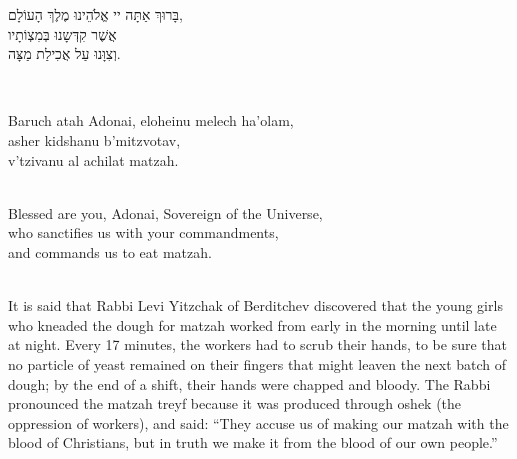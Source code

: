 \documentclass[extrafontsizes,twoside,17pt,a4paper,openany]{memoir}
\newcommand{\ch}{ch}
\newenvironment{HgHebrew}{\begin{hebrew}\noindent\large}{\end{hebrew}}
\newenvironment{HgEnglish}{\strut\\\noindent}{\vspace{1em}}
\newenvironment{HgTranslit}{\strut\\\noindent\begin{itshape}}{\end{itshape}\vspace{1em}}
\begin{document}
\begin{HgHebrew}
  בָּרוּךְ אַתָּה יי אֱלֹהֵינוּ מֶלֶךְ הָעוֹלָם,
  \\
  אֲשֶׁר קִדְּשָנוּ בְּמִצְוֹתָיו
  \phantom{וְצִוָּנוּ עַל אֲכִילַת מַצָּה.}
  \\
  וְצִוָּנוּ עַל אֲכִילַת מַצָּה.
\end{HgHebrew}

\begin{HgTranslit}
  Baru{\ch} atah Adonai, eloheinu mele{\ch} ha'olam, \\
  asher kidshanu b'mitzvotav, \\
  v'tzivanu al a{\ch}ilat matzah.
\end{HgTranslit}

\begin{HgEnglish}
  Blessed are you, Adonai, Sovereign of the Universe, \\
  who sanctifies us with your commandments, \\
  and commands us to eat matzah.
\end{HgEnglish}

\newpage

\begin{HgEnglish}
  It is said that Rabbi Levi Yitz{\ch}ak of Berditchev discovered that the young
  girls who kneaded the dough for matzah worked from early in the morning until
  late at night. Every 17 minutes, the workers had to scrub their hands, to be
  sure that no particle of yeast remained on their fingers that might leaven the
  next batch of dough; by the end of a shift, their hands were chapped and
  bloody.  The Rabbi pronounced the matzah treyf because it was produced through
  oshek (the oppression of workers), and said: ``They accuse us of making our
  matzah with the blood of Christians, but in truth we make it from the blood of
  our own people.'' 
\end{HgEnglish}

\end{document}
